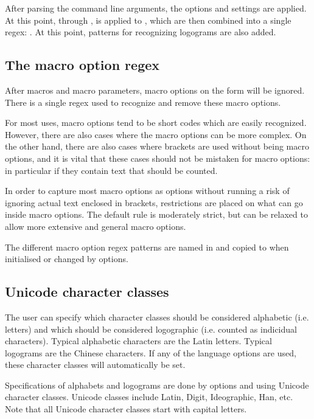 \documentclass{article}
\begin{document}
After parsing the command line arguments, the options and settings are applied. At this point, through ,  is applied to \code{\@WordPatterns}, which are then combined into a single regex: . At this point, patterns for recognizing logograms are also added.


\subsection{The macro option regex}

After macros and macro parameters, macro options on the form \code{[\ldots]} will be ignored. There is a single regex used to recognize and remove these macro options.

For most uses, macro options tend to be short codes which are easily recognized. However, there are also cases where the macro options can be more complex. On the other hand, there are also cases where brackets are used without being macro options, and it is vital that these cases should not be mistaken for macro options: in particular if they contain text that should be counted.

In order to capture most macro options as options without running a risk of ignoring actual text enclosed in brackets, restrictions are placed on what can go inside macro options. The default rule is moderately strict, but can be relaxed to allow more extensive and general macro options.

The different macro option regex patterns are named in  and copied to  when initialised or changed by options.


\subsection{Unicode character classes}

The user can specify which character classes should be considered alphabetic (i.e. letters) and which should be considered logographic (i.e. counted as indicidual characters). Typical alphabetic characters are the Latin letters. Typical logograms are the Chinese characters. If any of the language options are used, these character classes will automatically be set.

Specifications of alphabets and logograms are done by options  and  using Unicode character classes. Unicode classes include Latin, Digit, Ideographic, Han, etc. Note that all Unicode character classes start with capital letters. 
\end{document}
